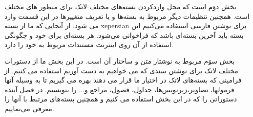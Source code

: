  بخش دوَم  است که محل واردکردن بسته‌های مختلف لاتک برای منظور های مختلف است. همچنین تنظیمات دیگر مربوط به بسته‌ها و یا تعریف متغییرها در این قسمت وارد می شود. از آنجایی که ما از بسته xepersian برای نوشتن فارسی استفاده می‌کنیم این بسته باید آخرین بسته‌ای باشد که فراخوانی می‌شود. هر بسته‌ای برای خود و چگونگی استفاده از آن روی اینترنت مستندات مربوط به خود را دارد.
 
 بخش سوَم مربوط به نوشتار متن و ساختار آن است. در این بخش ما از دستورات مختلف لاتک برای نوشتن سندی که می خواهیم به دست آوریم استفاده می کنیم. از فرامینی که بسته‌های لاتک در اختیار ما قرار می دهند بهره می گیریم تا به وسیله آنها فرمولها، تصاویر،زیرنویس‌ها، جداول، فصول، مراجع و... را بنویسیم. در فصل آینده دستوراتی را که در این بخش استفاده می کنیم و همچنین بسته‌های مرتبط با آنها را معرفی می‌نماییم.
